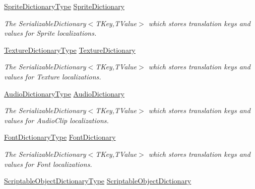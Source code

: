 \begin{DoxyCompactItemize}
\hyperlink{class_translation_asset_1_1_sprite_dictionary_type}{Sprite\+Dictionary\+Type} \hyperlink{class_translation_asset_a360f0776ee8f75f6d24e46543f47f029}{Sprite\+Dictionary}
\begin{DoxyCompactList}\small\item\em The Serializable\+Dictionary$<$\+T\+Key,\+T\+Value$>$ which stores translation keys and values for Sprite localizations. \end{DoxyCompactList}\item 
\hyperlink{class_translation_asset_1_1_texture_dictionary_type}{Texture\+Dictionary\+Type} \hyperlink{class_translation_asset_a044032e0de74a8c42a74d76258c479f1}{Texture\+Dictionary}
\begin{DoxyCompactList}\small\item\em The Serializable\+Dictionary$<$\+T\+Key,\+T\+Value$>$ which stores translation keys and values for Texture localizations. \end{DoxyCompactList}\item 
\hyperlink{class_translation_asset_1_1_audio_dictionary_type}{Audio\+Dictionary\+Type} \hyperlink{class_translation_asset_ab6f5c704931460ca1cf58506a9681c65}{Audio\+Dictionary}
\begin{DoxyCompactList}\small\item\em The Serializable\+Dictionary$<$\+T\+Key,\+T\+Value$>$ which stores translation keys and values for Audio\+Clip localizations. \end{DoxyCompactList}\item 
\hyperlink{class_translation_asset_1_1_font_dictionary_type}{Font\+Dictionary\+Type} \hyperlink{class_translation_asset_afcfa466e5de06d5da5aab787fb93d54f}{Font\+Dictionary}
\begin{DoxyCompactList}\small\item\em The Serializable\+Dictionary$<$\+T\+Key,\+T\+Value$>$ which stores translation keys and values for Font localizations. \end{DoxyCompactList}\item 
\hyperlink{class_translation_asset_1_1_scriptable_object_dictionary_type}{Scriptable\+Object\+Dictionary\+Type} \hyperlink{class_translation_asset_a94c96a2eb5ea41e83a3d1d91002b86d6}{Scriptable\+Object\+Dictionary}

\end{DoxyCompactItemize}
